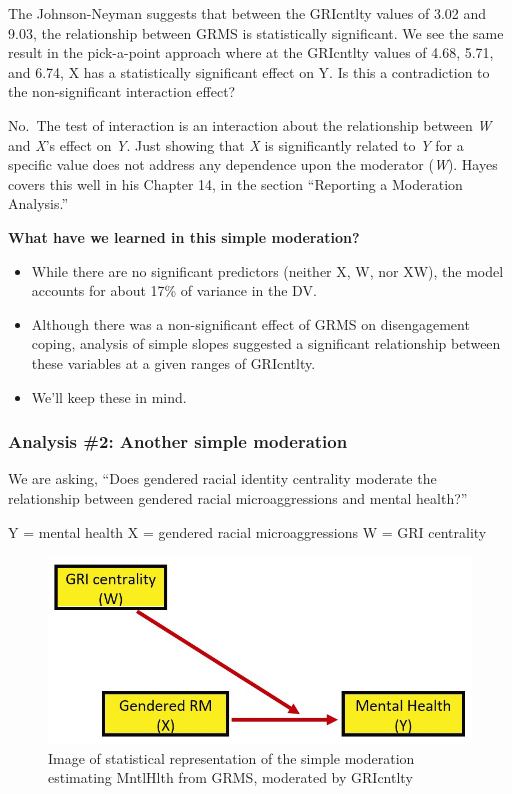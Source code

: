 \documentclass[
]{book}
\providecommand{\tightlist}{%
  \setlength{\itemsep}{0pt}\setlength{\parskip}{0pt}}
\begin{document}
The Johnson-Neyman suggests that between the GRIcntlty values of 3.02 and 9.03, the relationship between GRMS is statistically significant. We see the same result in the pick-a-point approach where at the GRIcntlty values of 4.68, 5.71, and 6.74, X has a statistically significant effect on Y. Is this a contradiction to the non-significant interaction effect?

No.~The test of interaction is an interaction about the relationship between \emph{W} and \emph{X}'s effect on \emph{Y}. Just showing that \emph{X} is significantly related to \emph{Y} for a specific value does not address any dependence upon the moderator (\emph{W}). Hayes \citeyearpar{hayes_introduction_2018} covers this well in his Chapter 14, in the section ``Reporting a Moderation Analysis.''

\textbf{What have we learned in this simple moderation?}

\begin{itemize}
\tightlist
\item
  While there are no significant predictors (neither X, W, nor XW), the model accounts for about 17\% of variance in the DV.
\item
  Although there was a non-significant effect of GRMS on disengagement coping, analysis of simple slopes suggested a significant relationship between these variables at a given ranges of GRIcntlty.
\item
  We'll keep these in mind.
\end{itemize}

\hypertarget{analysis-2-another-simple-moderation}{%
\subsubsection{Analysis \#2: Another simple moderation}\label{analysis-2-another-simple-moderation}}

We are asking, ``Does gendered racial identity centrality moderate the relationship between gendered racial microaggressions and mental health?''

Y = mental health
X = gendered racial microaggressions
W = GRI centrality

\begin{figure}
\centering
\includegraphics{images/ModMed/LewisMod2.jpg}
\caption{Image of statistical representation of the simple moderation estimating MntlHlth from GRMS, moderated by GRIcntlty}
\end{figure}
\end{document}
